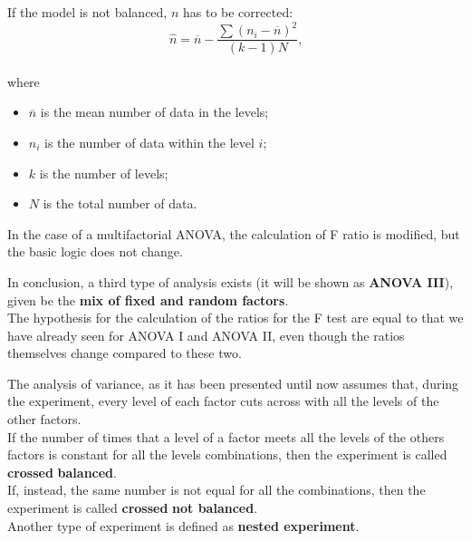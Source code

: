 \begin{frame}
  If the model is not balanced, ${n}$ has to be corrected:\\
  $$ \hat{n}=\overline{n}-\frac{\sum{({n}_{i}-\overline{n})^2}}{(k-1)N} \mbox{,} $$\\
  where
  \begin{itemize}
    \item $\overline{n}$ is the mean number of data in the levels; 
    \item ${n}_{i}$ is the number of data within the level $i$;
    \item ${k}$ is the number of levels;
    \item ${N}$ is the total number of data.
  \end{itemize}
  \vspace{.50cm}
  In the case of a multifactorial ANOVA, the calculation of F ratio is modified, but the basic logic does not change.
\end{frame}

\begin{frame}
  \vspace*{.75cm}
  In conclusion, a third type of analysis exists (it will be shown as \textbf{ANOVA III}), given be the \textbf{mix of fixed and random factors}.\\
  \vspace* {.75cm}
  The hypothesis for the calculation of the ratios for the F test are equal to that we have already seen for ANOVA I and ANOVA II, even though the ratios themselves change compared to these two.
\end{frame}


\begin{frame}
  \vspace*{.25cm} 
  The analysis of variance, as it has been presented until now assumes that, during the experiment, every level of each factor cuts across with all the levels of the other factors.\\
  \vspace*{.5cm} 
  If the number of times that a level of a factor meets all the levels of the others factors is constant for all the levels combinations, then the experiment is called \textbf{crossed} \textbf{balanced}.\\
  \vspace*{.5cm} 
  If, instead, the same number is not equal for all the combinations, then the experiment is called \textbf{crossed} \textbf{not balanced}.\\
  \vspace*{.5cm} 
  Another type of experiment is defined as \textbf{nested experiment}.
\end{frame}

